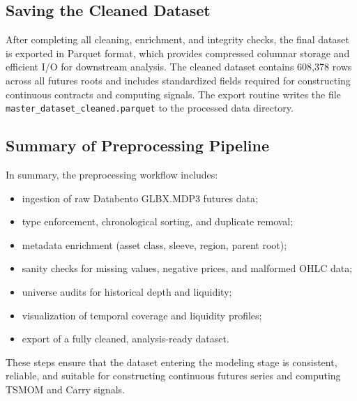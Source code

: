 \documentclass{article}
\begin{document}
\subsection{Saving the Cleaned Dataset}

After completing all cleaning, enrichment, and integrity checks, the final dataset is exported in Parquet
format, which provides compressed columnar storage and efficient I/O for downstream analysis. The
cleaned dataset contains 608{,}378 rows across all futures roots and includes standardized fields required
for constructing continuous contracts and computing signals. The export routine writes the file
\texttt{master\_dataset\_cleaned.parquet} to the processed data directory.

\subsection{Summary of Preprocessing Pipeline}

In summary, the preprocessing workflow includes:

\begin{itemize}
    \item ingestion of raw Databento GLBX.MDP3 futures data;
    \item type enforcement, chronological sorting, and duplicate removal;
    \item metadata enrichment (asset class, sleeve, region, parent root);
    \item sanity checks for missing values, negative prices, and malformed OHLC data;
    \item universe audits for historical depth and liquidity;
    \item visualization of temporal coverage and liquidity profiles;
    \item export of a fully cleaned, analysis-ready dataset.
\end{itemize}

These steps ensure that the dataset entering the modeling stage is consistent, reliable, and suitable for
constructing continuous futures series and computing TSMOM and Carry signals.
\end{document}
